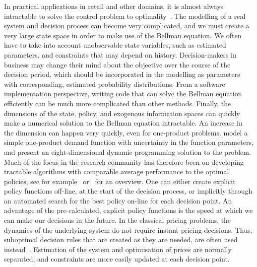 \documentclass[main.tex]{subfiles}
\begin{document}
In practical applications in retail and other domains, it is almost always
intractable to solve the control problem to optimality~\citep{farmer2017uncertainty}.
The modelling of a real system and decision process can become very
complicated, and  we must  create a very
large state space in order to make use of the Bellman equation.
We often have to take into account unobservable
state variables, such as estimated parameters, and constraints
that may depend on history. Decision-makers in business may change their mind
about the objective over the course of the decision period, which should
be incorporated in the modelling as parameters with corresponding, estimated
probability distributions.
From a software implementation perspective, writing code that can
solve the Bellman equation efficiently can be much more complicated
than other methods.
Finally, the dimensions of the state, policy, and exogenous
information spaces can quickly make a numerical solution to the Bellman
equation intractable. An increase in the dimension can happen very
quickly, even for one-product problems.
\citet{bertsimas2001dynamic} model a simple
one-product demand function with uncertainty in the function
parameters, and present an eight-dimensional dynamic programming
solution to the problem.
Much of the focus in the research community has therefore been on
developing tractable algorithms with comparable average performance to the
optimal policies, see for
example~\citet{powell2011approximate} or~\citet{bertsekas2012dynamic}
for an overview.
One can either create explicit policy functions off-line, at the
start of the decision process, or implicitly through an automated
search for the best policy on-line for each decision point.
An advantage of the pre-calculated, explicit policy functions
is the speed at which we can make our decisions in the
future. In the classical pricing problems, the dynamics of the
underlying system do not require instant pricing decisions. Thus,
suboptimal decision rules that are created as they are needed, are often used
instead~\citep{talluri2006theory}. Estimation of the system and optimisation of prices are
normally separated, and constraints are more easily updated at each
decision point.
\end{document}
